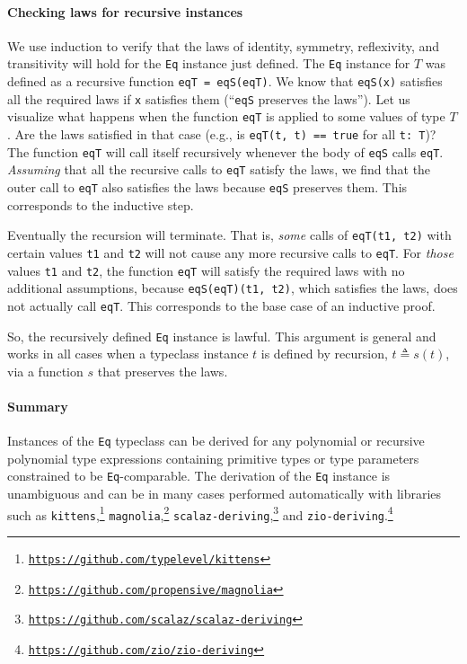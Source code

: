 \paragraph{Checking laws for recursive instances}

We use induction to verify that the laws of identity, symmetry, reflexivity,
and transitivity will hold for the \lstinline!Eq! instance just defined.
The \lstinline!Eq! instance for $T$ was defined as a recursive function
\lstinline!eqT = eqS(eqT)!. We know that \lstinline!eqS(x)! satisfies
all the required laws if \lstinline!x! satisfies them (\textsf{``}\lstinline!eqS!
preserves the laws\textsf{''}). Let us visualize what happens when the function
\lstinline!eqT! is applied to some values of type $T$. Are the laws
satisfied in that case (e.g., is \lstinline!eqT(t, t) == true! for
all \lstinline!t: T!)? The function \lstinline!eqT! will call itself
recursively whenever the body of \lstinline!eqS! calls \lstinline!eqT!.
\emph{Assuming} that all the recursive calls to \lstinline!eqT! satisfy
the laws, we find that the outer call to \lstinline!eqT! also satisfies
the laws because \lstinline!eqS! preserves them. This corresponds
to the inductive step.

Eventually the recursion will terminate. That is, \emph{some} calls
of \lstinline!eqT(t1, t2)! with certain values \lstinline!t1! and
\lstinline!t2! will not cause any more recursive calls to \lstinline!eqT!.
For \emph{those} values \lstinline!t1! and \lstinline!t2!, the function
\lstinline!eqT! will satisfy the required laws with no additional
assumptions, because \lstinline!eqS(eqT)(t1, t2)!, which satisfies
the laws, does not actually call \lstinline!eqT!. This corresponds
to the base case of an inductive proof. 

So, the recursively defined \lstinline!Eq! instance is lawful. This
argument is general and works in all cases when a typeclass instance
$t$ is defined by recursion, $t\triangleq s(t)$, via a function
$s$ that preserves the laws.

\paragraph{Summary}

Instances of the \lstinline!Eq! typeclass can be derived for any
polynomial or recursive polynomial type expressions containing primitive
types or type parameters constrained to be \lstinline!Eq!-comparable.
The derivation of the \lstinline!Eq! instance is unambiguous and
can be in many cases performed automatically with libraries such as
\texttt{kittens},\footnote{\texttt{\href{https://github.com/typelevel/kittens}{https://github.com/typelevel/kittens}}}
\texttt{magnolia},\footnote{\texttt{\href{https://github.com/propensive/magnolia}{https://github.com/propensive/magnolia}}}
\texttt{scalaz-deriving},\footnote{\texttt{\href{https://github.com/scalaz/scalaz-deriving}{https://github.com/scalaz/scalaz-deriving}}}
and \texttt{zio-deriving}.\footnote{\texttt{\href{https://github.com/zio/zio-deriving}{https://github.com/zio/zio-deriving}}}

